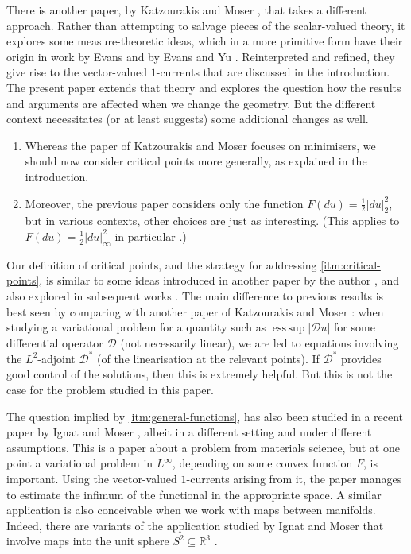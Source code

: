 \documentclass[10pt,a4paper]{amsart}
\newcommand{\R}{\mathbb{R}}
\DeclareMathOperator*{\esssup}{ess \, sup}
\begin{document}
There is another paper, by Katzourakis and Moser \cite{Katzourakis-Moser:25},
that takes a different approach. Rather than attempting to salvage pieces
of the scalar-valued theory, it explores some measure-theoretic ideas, which in a
more primitive form have their origin in work by Evans \cite{Evans:03.2} and by
Evans and Yu \cite{Evans-Yu:05}. Reinterpreted and refined, they give rise
to the vector-valued $1$-currents that are discussed in the introduction.
The present paper extends that theory and explores the question how the results and arguments
are affected when we change the geometry. But the different context necessitates (or at least
suggests) some additional changes as well.
\begin{enumerate}
\item \label{itm:critical-points}
Whereas the paper of Katzourakis and Moser focuses on minimisers, we should now consider critical points more generally,
as explained in the introduction.
\item \label{itm:general-functions}
Moreover, the previous paper considers only the
function $F(du) = \frac{1}{2} |du|_2^2$, but in various contexts, other choices are
just as interesting. (This applies to $F(du) = \frac{1}{2} |du|_\infty^2$
in particular
\cite{Sheffield-Smart:12, Daskalopoulos-Uhlenbeck:24, Daskalopoulos-Uhlenbeck:22, Daskalopoulos-Uhlenbeck:24.2}.)
\end{enumerate}

Our definition of critical points, and the strategy for addressing \ref{itm:critical-points},
is similar to some ideas introduced in another paper by the author \cite{Moser:22}, and also
explored in subsequent works \cite{Katzourakis-Moser:23, Gallagher-Moser:23, Gallagher-Moser:24}.
The main difference to previous results is best seen by comparing with
another paper of Katzourakis and Moser
\cite{Katzourakis-Moser:23}: when studying a variational problem for a quantity such as $\esssup |\mathcal{D} u|$
for some differential operator $\mathcal{D}$ (not necessarily linear), we are led to equations involving the $L^2$-adjoint
$\mathcal{D}^*$ (of the linearisation at the relevant points). If $\mathcal{D}^*$ provides good control of
the solutions, then this is extremely helpful. But this is not the case for the problem studied in this paper.

The question implied by \ref{itm:general-functions}, has also been studied in a recent paper by Ignat and Moser
\cite{Ignat-Moser:25}, albeit in a different setting and under different assumptions.
This is a paper about a problem from materials science, but at one
point a variational problem in $L^\infty$, depending on some convex function $F$, is important.
Using the vector-valued $1$-currents arising from it, the paper manages to estimate the
infimum of the functional in the appropriate space. A similar application is also conceivable
when we work with maps between manifolds. Indeed, there are variants of the application
studied by Ignat and Moser that involve maps into the unit sphere $S^2 \subseteq \R^3$ \cite{Ignat-Merlet:11}.
\end{document}
